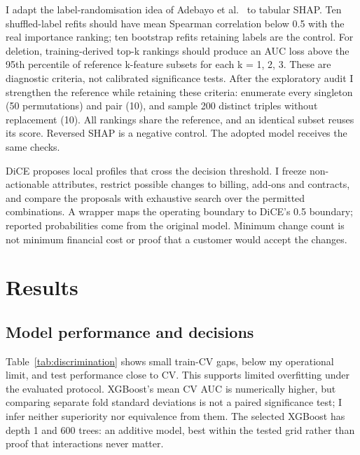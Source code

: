 \documentclass[10pt,a4paper]{article}
\begin{document}
I adapt the label-randomisation idea of Adebayo et al.~\cite{adebayo2018} to
tabular SHAP. Ten shuffled-label refits should have mean Spearman
correlation below 0.5 with the real importance ranking; ten bootstrap
refits retaining labels are the control. For deletion, training-derived
top-k rankings should produce an AUC loss above the 95th percentile of
reference k-feature subsets for each k = 1, 2, 3. These are diagnostic
criteria, not calibrated significance tests. After the exploratory audit
I strengthen the reference while retaining these criteria: enumerate
every singleton (50 permutations) and pair (10), and sample 200 distinct
triples without replacement (10). All rankings share the reference, and
an identical subset reuses its score. Reversed SHAP is a negative
control. The adopted model receives the same checks.

DiCE \cite{mothilal2020} proposes local profiles that cross the decision threshold.
I freeze non-actionable attributes, restrict possible changes to
billing, add-ons and contracts, and compare the proposals with
exhaustive search over the permitted combinations. A wrapper maps the
operating boundary to DiCE's 0.5 boundary; reported probabilities come
from the original model. Minimum change count is not minimum financial
cost or proof that a customer would accept the changes.

\section{Results}\label{results}

\subsection{Model performance and
decisions}\label{model-performance-and-decisions}

Table~\ref{tab:discrimination} shows small train-CV gaps, below my operational limit, and test
performance close to CV. This supports limited overfitting under the
evaluated protocol. XGBoost's mean CV AUC is numerically higher, but
comparing separate fold standard deviations is not a paired significance
test; I infer neither superiority nor equivalence from them. The
selected XGBoost has depth 1 and 600 trees: an additive model, best
within the tested grid rather than proof that interactions never matter.
\end{document}
